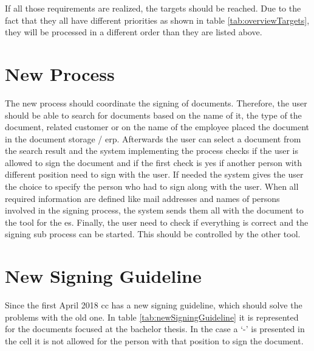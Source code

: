  If all those requirements are realized, the targets should be reached. Due to the fact that they all have different priorities as shown in table \ref{tab:overviewTargets}, they will be processed in a different order than they are listed above.

\section{New Process}
The new process should coordinate the signing of documents. Therefore, the user should be able to search for documents based on the name of it, the type of the document, related customer or on the name of the employee placed the document in the document storage / \gls{erp}. Afterwards the user can select a document from the search result and the system implementing the process checks if the user is allowed to sign the document and if the first check is yes if another person with different position need to sign with the user. If needed the system gives the user the choice to specify the person who had to sign along with the user. When all required information are defined like mail addresses and names of persons involved in the signing process, the system sends them all with the document to the tool for the \gls{es}. Finally, the user need to check if everything is correct and the signing sub process can be started. This should be controlled by the other tool. 

\section{New Signing Guideline}
Since the first April 2018 \gls{cc} has a new signing guideline, which should solve the problems with the old one. In table \ref{tab:newSigningGuideline} it is represented for the documents focused at the bachelor thesis. In the case a `-' is presented in the cell it is not allowed for the person with that position to sign the document.

